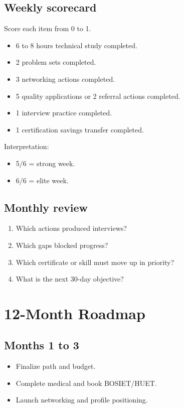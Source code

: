 \documentclass[11pt,openany]{book}
\begin{document}
\section{Weekly scorecard}
Score each item from 0 to 1.
\begin{itemize}
  \item 6 to 8 hours technical study completed.
  \item 2 problem sets completed.
  \item 3 networking actions completed.
  \item 5 quality applications or 2 referral actions completed.
  \item 1 interview practice completed.
  \item 1 certification savings transfer completed.
\end{itemize}

Interpretation:
\begin{itemize}
  \item 5/6 = strong week.
  \item 6/6 = elite week.
\end{itemize}

\section{Monthly review}
\begin{enumerate}
  \item Which actions produced interviews?
  \item Which gaps blocked progress?
  \item Which certificate or skill must move up in priority?
  \item What is the next 30-day objective?
\end{enumerate}

\chapter{12-Month Roadmap}

\section{Months 1 to 3}
\begin{itemize}
  \item Finalize path and budget.
  \item Complete medical and book BOSIET/HUET.
  \item Launch networking and profile positioning.
\end{itemize}
\end{document}
